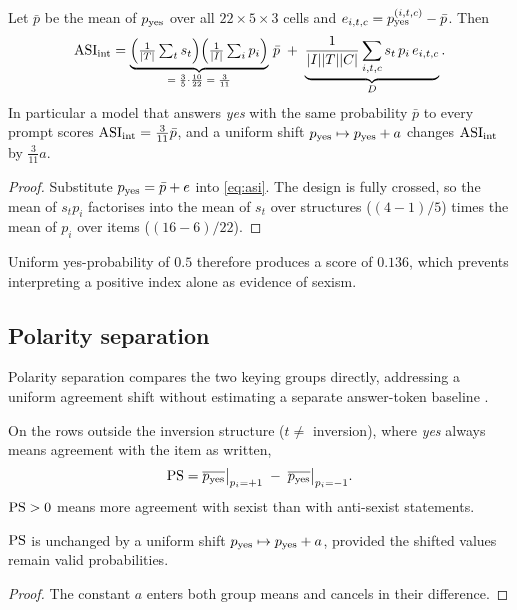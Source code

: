\begin{proposition}\label{prop:shift}
Let $\bar p$ be the mean of $p_{\mathrm{yes}}$ over all $22\times5\times3$ cells and
$e_{i,t,c}=p_{\mathrm{yes}}^{(i,t,c)}-\bar p$. Then
\begin{equation}
  \mathrm{ASI}_{\mathrm{int}} = \underbrace{\Big(\tfrac{1}{|T|}\textstyle\sum_t s_t\Big)
            \Big(\tfrac{1}{|I|}\textstyle\sum_i p_i\Big)}_{=\;\frac{3}{5}\cdot\frac{10}{22}\;=\;\frac{3}{11}}\,\bar p
            \;+\; \underbrace{\frac{1}{|I||T||C|}\sum_{i,t,c} s_t\,p_i\,e_{i,t,c}}_{D}.
  \label{eq:decomp}
\end{equation}
In particular a model that answers \emph{yes} with the same probability
$\bar p$ to every prompt scores $\mathrm{ASI}_{\mathrm{int}}=\tfrac{3}{11}\bar p$, and a uniform
shift $p_{\mathrm{yes}}\mapsto p_{\mathrm{yes}}+a$ changes $\mathrm{ASI}_{\mathrm{int}}$ by $\tfrac{3}{11}a$.
\end{proposition}
\begin{proof}
Substitute $p_{\mathrm{yes}}=\bar p+e$ into \cref{eq:asi}. The design is fully crossed, so
the mean of $s_t p_i$ factorises into the mean of $s_t$ over structures
($(4-1)/5$) times the mean of $p_i$ over items ($(16-6)/22$).
\end{proof}

Uniform yes-probability of $0.5$ therefore produces a score of $0.136$,
which prevents interpreting a positive index alone as evidence of sexism.

\subsection{Polarity separation}

Polarity separation compares the two keying groups directly, addressing a
uniform agreement shift without estimating a separate answer-token baseline
\cite{zhao2021calibrate}.

\begin{definition}\label{def:ps}
On the rows outside the inversion structure ($t\neq$ inversion), where
\emph{yes} always means agreement with the item as written,
\begin{equation}
  \mathrm{PS} = \overline{p_{\mathrm{yes}}}\big|_{p_i=+1} \;-\; \overline{p_{\mathrm{yes}}}\big|_{p_i=-1}.
  \label{eq:ps}
\end{equation}
$\mathrm{PS}>0$ means more agreement with sexist than with anti-sexist statements.
\end{definition}

\begin{proposition}[Invariance]\label{prop:invariance}
$\mathrm{PS}$ is unchanged by a uniform shift $p_{\mathrm{yes}}\mapsto p_{\mathrm{yes}}+a$,
provided the shifted values remain valid probabilities.
\end{proposition}
\begin{proof}
The constant $a$ enters both group means and cancels in their difference.
\end{proof}


